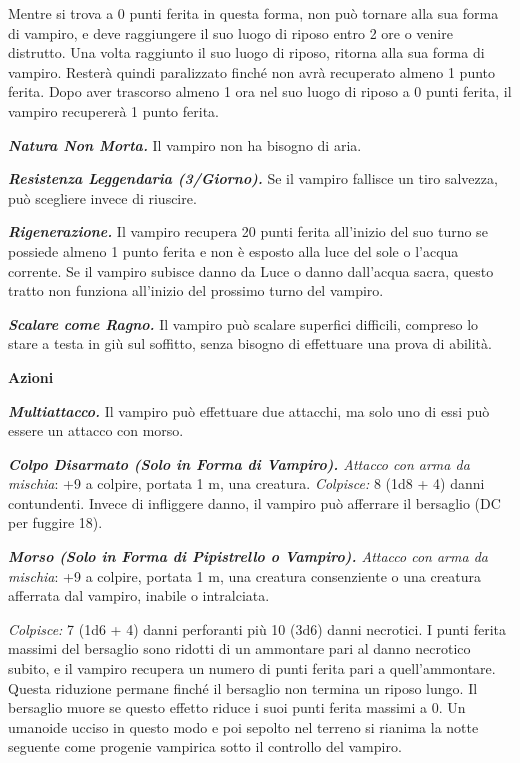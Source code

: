 \begin{multicols}{2}
Mentre si trova a 0 punti ferita in questa forma, non può tornare alla
sua forma di vampiro, e deve raggiungere il suo luogo di riposo entro 2
ore o venire distrutto. Una volta raggiunto il suo luogo di riposo,
ritorna alla sua forma di vampiro. Resterà quindi paralizzato finché non
avrà recuperato almeno 1 punto ferita. Dopo aver trascorso almeno 1 ora
nel suo luogo di riposo a 0 punti ferita, il vampiro recupererà 1 punto
ferita.

\emph{\textbf{Natura Non Morta.}} Il vampiro non ha bisogno di aria.

\emph{\textbf{Resistenza Leggendaria (3/Giorno).}} Se il vampiro
fallisce un tiro salvezza, può scegliere invece di riuscire.



\emph{\textbf{Rigenerazione.}} Il vampiro recupera 20 punti ferita
all'inizio del suo turno se possiede almeno 1 punto ferita e non è
esposto alla luce del sole o l'acqua corrente. Se il vampiro subisce
danno da Luce o danno dall'acqua sacra, questo tratto non funziona
all'inizio del prossimo turno del vampiro.

\emph{\textbf{Scalare come Ragno.}} Il vampiro può scalare superfici
difficili, compreso lo stare a testa in giù sul soffitto, senza bisogno
di effettuare una prova di abilità.

\smallskip\textbf{Azioni}

\emph{\textbf{Multiattacco.}} Il vampiro può effettuare due attacchi, ma
solo uno di essi può essere un attacco con morso.

\emph{\textbf{Colpo Disarmato (Solo in Forma di Vampiro).} Attacco con
arma da mischia}: +9 a colpire, portata 1 m, una creatura.
\emph{Colpisce:} 8 (1d8 + 4) danni contundenti. Invece di infliggere
danno, il vampiro può afferrare il bersaglio (DC per fuggire 18).

\emph{\textbf{Morso (Solo in Forma di Pipistrello o Vampiro).} Attacco
con arma da mischia}: +9 a colpire, portata 1 m, una creatura
consenziente o una creatura afferrata dal vampiro, inabile o
intralciata.

\emph{Colpisce:} 7 (1d6 + 4) danni perforanti più 10 (3d6) danni
necrotici. I punti ferita massimi del bersaglio sono ridotti di un
ammontare pari al danno necrotico subito, e il vampiro recupera un
numero di punti ferita pari a quell'ammontare. Questa riduzione permane
finché il bersaglio non termina un riposo lungo. Il bersaglio muore se
questo effetto riduce i suoi punti ferita massimi a 0. Un umanoide
ucciso in questo modo e poi sepolto nel terreno si rianima la notte
seguente come progenie vampirica sotto il controllo del vampiro.


\end{multicols}
